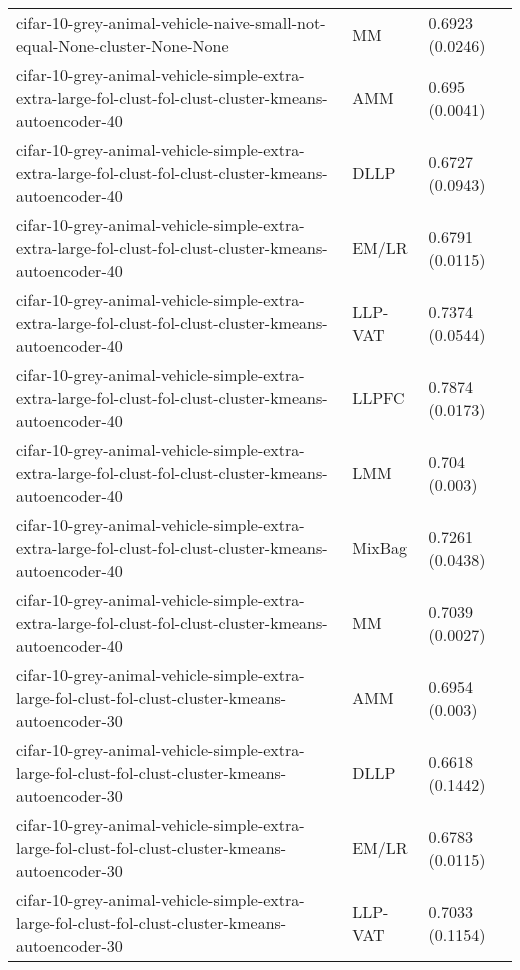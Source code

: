 \begin{longtable}{lll}
                                    cifar-10-grey-animal-vehicle-naive-small-not-equal-None-cluster-None-None &        MM &                       0.6923 (0.0246) \\
      cifar-10-grey-animal-vehicle-simple-extra-extra-large-fol-clust-fol-clust-cluster-kmeans-autoencoder-40 &       AMM &                        0.695 (0.0041) \\
      cifar-10-grey-animal-vehicle-simple-extra-extra-large-fol-clust-fol-clust-cluster-kmeans-autoencoder-40 &      DLLP &                       0.6727 (0.0943) \\
      cifar-10-grey-animal-vehicle-simple-extra-extra-large-fol-clust-fol-clust-cluster-kmeans-autoencoder-40 &     EM/LR &                       0.6791 (0.0115) \\
      cifar-10-grey-animal-vehicle-simple-extra-extra-large-fol-clust-fol-clust-cluster-kmeans-autoencoder-40 &   LLP-VAT &                       0.7374 (0.0544) \\
      cifar-10-grey-animal-vehicle-simple-extra-extra-large-fol-clust-fol-clust-cluster-kmeans-autoencoder-40 &     LLPFC &                       0.7874 (0.0173) \\
      cifar-10-grey-animal-vehicle-simple-extra-extra-large-fol-clust-fol-clust-cluster-kmeans-autoencoder-40 &       LMM &                         0.704 (0.003) \\
      cifar-10-grey-animal-vehicle-simple-extra-extra-large-fol-clust-fol-clust-cluster-kmeans-autoencoder-40 &    MixBag &                       0.7261 (0.0438) \\
      cifar-10-grey-animal-vehicle-simple-extra-extra-large-fol-clust-fol-clust-cluster-kmeans-autoencoder-40 &        MM &                       0.7039 (0.0027) \\
            cifar-10-grey-animal-vehicle-simple-extra-large-fol-clust-fol-clust-cluster-kmeans-autoencoder-30 &       AMM &                        0.6954 (0.003) \\
            cifar-10-grey-animal-vehicle-simple-extra-large-fol-clust-fol-clust-cluster-kmeans-autoencoder-30 &      DLLP &                       0.6618 (0.1442) \\
            cifar-10-grey-animal-vehicle-simple-extra-large-fol-clust-fol-clust-cluster-kmeans-autoencoder-30 &     EM/LR &                       0.6783 (0.0115) \\
            cifar-10-grey-animal-vehicle-simple-extra-large-fol-clust-fol-clust-cluster-kmeans-autoencoder-30 &   LLP-VAT &                       0.7033 (0.1154) \\

\end{longtable}
